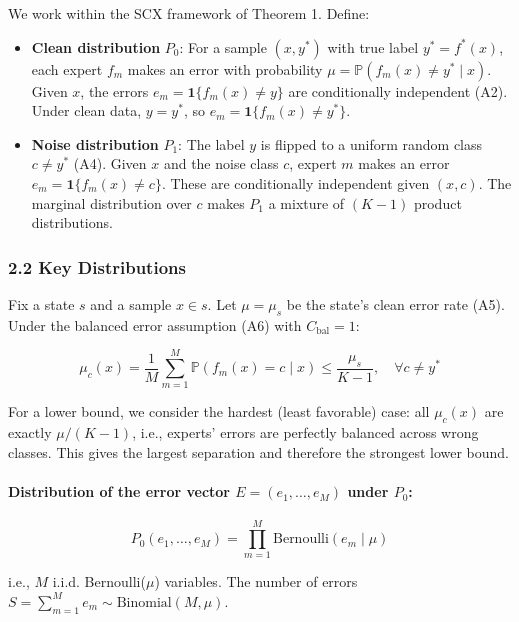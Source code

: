 \documentclass[
  12pt,
]{article}
\begin{document}
We work within the SCX framework of Theorem 1. Define:

\begin{itemize}
\item
  \textbf{Clean distribution} \(P_0\): For a sample \((x, y^*)\) with
  true label \(y^* = f^*(x)\), each expert \(f_m\) makes an error with
  probability \(\mu = \mathbb{P}(f_m(x) \neq y^* \mid x)\). Given \(x\),
  the errors \(e_m = \mathbf{1}\{f_m(x) \neq y\}\) are conditionally
  independent (A2). Under clean data, \(y = y^*\), so
  \(e_m = \mathbf{1}\{f_m(x) \neq y^*\}\).
\item
  \textbf{Noise distribution} \(P_1\): The label \(y\) is flipped to a
  uniform random class \(c \neq y^*\) (A4). Given \(x\) and the noise
  class \(c\), expert \(m\) makes an error
  \(e_m = \mathbf{1}\{f_m(x) \neq c\}\). These are conditionally
  independent given \((x,c)\). The marginal distribution over \(c\)
  makes \(P_1\) a mixture of \((K-1)\) product distributions.
\end{itemize}

\subsubsection{2.2 Key Distributions}\label{key-distributions}

Fix a state \(s\) and a sample \(x \in s\). Let \(\mu = \mu_s\) be the
state's clean error rate (A5). Under the balanced error assumption (A6)
with \(C_{\text{bal}} = 1\):

\[\mu_c(x) = \frac{1}{M} \sum_{m=1}^M \mathbb{P}(f_m(x) = c \mid x) \leq \frac{\mu_s}{K-1}, \quad \forall c \neq y^*\]

For a lower bound, we consider the hardest (least favorable) case: all
\(\mu_c(x)\) are exactly \(\mu/(K-1)\), i.e., experts' errors are
perfectly balanced across wrong classes. This gives the largest
separation and therefore the strongest lower bound.

\paragraph{\texorpdfstring{Distribution of the error vector
\(E = (e_1, \dots, e_M)\) under
\(P_0\):}{Distribution of the error vector E = (e\_1, \textbackslash dots, e\_M) under P\_0:}}\label{distribution-of-the-error-vector-e-e_1-dots-e_m-under-p_0}

\[P_0(e_1, \dots, e_M) = \prod_{m=1}^M \text{Bernoulli}(e_m \mid \mu)\]

i.e., \(M\) i.i.d. Bernoulli(\(\mu\)) variables. The number of errors
\(S = \sum_{m=1}^M e_m \sim \text{Binomial}(M, \mu)\).
\end{document}
